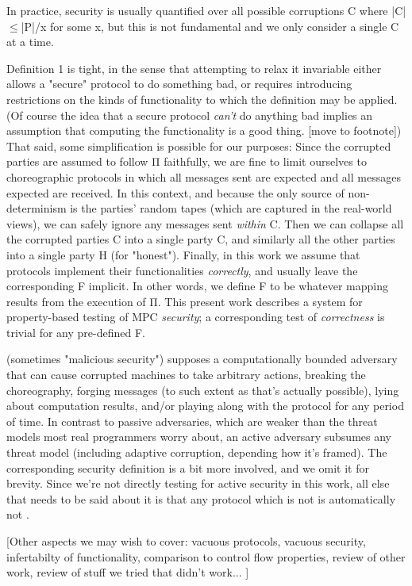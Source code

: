 \documentclass[conference]{IEEEtran}
\begin{document}
In practice, security is usually quantified over all possible corruptions C
where |C|$\leq$|P|/x for some x, but this is not fundamental and we only consider a single C at a time.

Definition 1 is tight, in the sense that attempting to relax it invariable either
allows a "secure" protocol to do something bad, or requires introducing restrictions
on the kinds of functionality to which the definition may be applied.
(Of course the idea that a secure protocol \textit{can't} do anything bad implies an assumption that computing
the functionality is a good thing. [move to footnote])
That said, some simplification is possible for our purposes:
Since the corrupted parties are assumed to follow Π faithfully, we are fine to limit ourselves to
choreographic protocols in which all messages sent are expected and all messages expected are received.
In this context, and because the only source of non-determinism is the parties' random tapes
(which are captured in the real-world views),
we can safely ignore any messages sent \textit{within} C.
Then we can collapse all the corrupted parties C into a single party C,
and similarly all the other parties into a single party H (for "honest").
Finally, in this work we assume that protocols implement their functionalities \textit{correctly},
and usually leave the corresponding F implicit.
In other words, we define F to be whatever mapping results from the execution of Π.
This present work describes a system for property-based testing of MPC \textit{security};
a corresponding test of \textit{correctness} is trivial for any pre-defined F.

 (sometimes "malicious security")
supposes a computationally bounded adversary that can cause corrupted machines to take arbitrary actions,
breaking the choreography,
forging messages (to such extent as that's actually possible),
lying about computation results,
and/or playing along with the protocol for any period of time.
In contrast to passive adversaries, which are weaker than the threat models most real programmers worry about,
an active adversary subsumes any threat model (including adaptive corruption, depending how it's framed).
The corresponding security definition is a bit more involved, and we omit it for brevity.
Since we're not directly testing for active security in this work,
all else that needs to be said about it is that
any protocol which is not  is automatically not .

[Other aspects we may wish to cover:
 vacuous protocols,
 vacuous security,
 infertabilty of functionality,
 comparison to control flow properties,
 review of other work,
 review of stuff we tried that didn't work...
 ]
\end{document}
